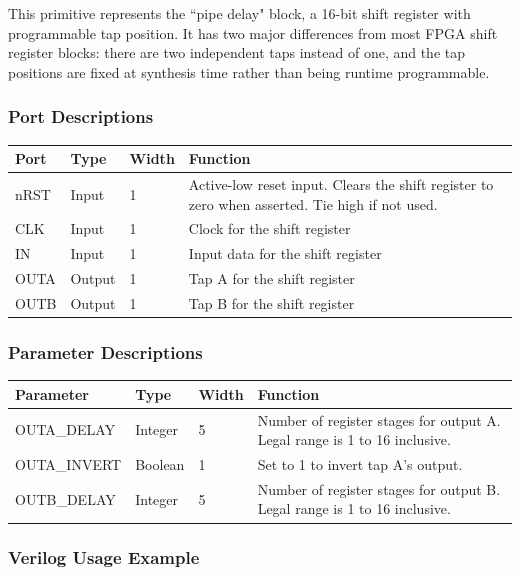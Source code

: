 \documentclass[11pt]{article}
\begin{document}
This primitive represents the ``pipe delay" block, a 16-bit shift register with programmable tap position. It has two 
major differences from most FPGA shift register blocks: there are two independent taps instead of one, and the tap 
positions are fixed at synthesis time rather than being runtime programmable.

\subsubsection{Port Descriptions}

\begin{tabularx}{5in}{|l|l|l|X|}
\hline
{\bfseries Port} & {\bfseries Type} & {\bfseries Width} & {\bfseries Function} \\
\hline
nRST & Input & 1 & Active-low reset input. Clears the shift register to zero when asserted. Tie high if not used.\\
\hline
CLK & Input & 1 & Clock for the shift register\\
\hline
IN & Input & 1 & Input data for the shift register\\
\hline
OUTA & Output & 1 & Tap A for the shift register\\
\hline
OUTB & Output & 1 & Tap B for the shift register\\
\hline
\end{tabularx}

\subsubsection{Parameter Descriptions}

\begin{tabularx}{5in}{|l|l|l|X|}
\hline
{\bfseries Parameter} & {\bfseries Type} & {\bfseries Width} & {\bfseries Function} \\
\hline
OUTA\_DELAY & Integer & 5 & Number of register stages for output A. Legal range is 1 to 16 inclusive.\\
\hline
OUTA\_INVERT & Boolean & 1 & Set to 1 to invert tap A's output.\\
\hline
OUTB\_DELAY & Integer & 5 & Number of register stages for output B. Legal range is 1 to 16 inclusive.\\
\hline
\end{tabularx}

\clearpage
\subsubsection{Verilog Usage Example}
\end{document}
